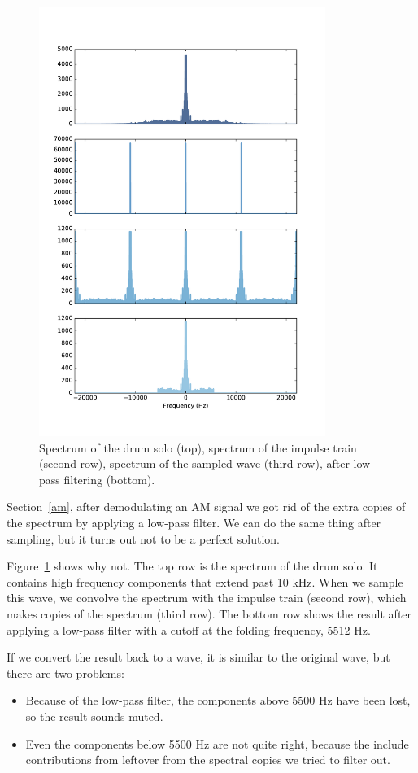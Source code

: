 \documentclass[12pt]{book}
\begin{document}
\begin{figure}
\centerline{\includegraphics[height=5.5in]{figs/sampling4.pdf}}
\caption{Spectrum of the drum solo (top), spectrum of the impulse
train (second row), spectrum of the sampled wave (third row),
after low-pass filtering (bottom).}
\label{fig.sampling4}
\end{figure}

Section~\ref{am}, after demodulating an AM signal we got rid of
the extra copies of the spectrum by applying a low-pass filter.
We can do the same thing after sampling, but it turns out
not to be a perfect solution.

Figure~\ref{fig.sampling4} shows why not.  The top row is the spectrum
of the drum solo.  It contains high frequency components that extend
past 10 kHz.  When we sample this wave, we convolve the spectrum 
with the impulse train (second row), which makes copies of the spectrum
(third row).  The bottom row shows the result after applying a low-pass
filter with a cutoff at the folding frequency, 5512 Hz.

If we convert the result back to a wave, it is similar to the original
wave, but there are two problems:

\begin{itemize}

\item Because of the low-pass filter, the components above 5500 Hz
have been lost, so the result sounds muted.

\item Even the components below 5500 Hz are not quite right, because
the include contributions from leftover from the spectral copies we
tried to filter out.

\end{itemize}
\end{document}

